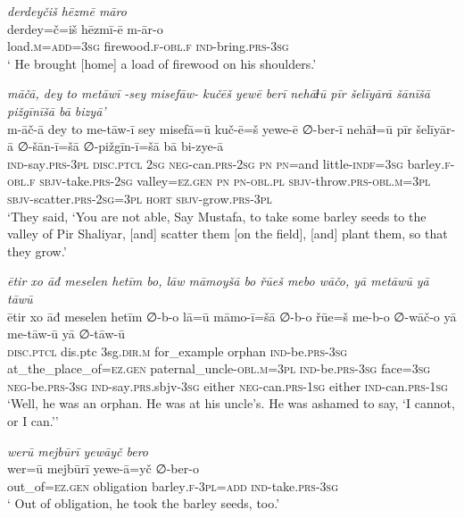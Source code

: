 \ea \label{ŽP.25}
\textit{derdeyčiš hēzmē māro} \\ 
\gll derdey=č=iš hēzmī-ē m-ār-o \\ 
 load\textsc{.m}\textsc{=add}\textsc{=3sg} firewood\textsc{.f}\textsc{-obl}\textsc{.f} \textsc{ind-}bring\textsc{.prs}\textsc{-3sg} \\ 
\glt ` He brought [home] a load of firewood on his shoulders.'
\z 
 
\ea \label{ŽP.27}
\textit{māčā, dey to metāwī -sey misefāw- kučēš yewē berī nehāɫū pīr šelīyārā šānīšā pižgīnīšā bā bizyā’} \\ 
\gll m-āč-ā dey to me-tāw-ī sey misefā=ū kuč-ē=š yewe-ē ∅-ber-ī nehāɫ=ū pīr šelīyār-ā ∅-šān-ī=šā ∅-pižgīn-ī=šā bā bi-zye-ā \\ 
 \textsc{ind-}say\textsc{.prs}\textsc{-3pl} \textsc{disc.ptcl} \textsc{2sg} \textsc{neg-}can\textsc{.prs}-\textsc{2sg} \textsc{pn} \textsc{pn}=and little\textsc{-indf}\textsc{=3sg} barley\textsc{.f}\textsc{-obl}\textsc{.f} \textsc{sbjv-}take\textsc{.prs}-\textsc{2sg} valley\textsc{\textsc{=ez.gen}} \textsc{pn} \textsc{pn}\textsc{-obl}\textsc{.pl} \textsc{sbjv-}throw\textsc{.prs}\textsc{-obl}\textsc{.m}\textsc{=3pl} \textsc{sbjv-}scatter\textsc{.prs}-\textsc{2sg}\textsc{=3pl} \textsc{hort} \textsc{sbjv-}grow\textsc{.prs}\textsc{-3pl} \\ 
\glt `They said, ‘You are not able, Say Mustafa, to take some barley seeds to the valley of Pir Shaliyar, [and] scatter them [on the field], [and] plant them, so that they grow.'
\z 
 
\ea \label{ŽP.28}
\textit{ētir xo āđ meselen hetīm bo, lāw māmoyšā bo řūeš mebo wāčo, yā metāwū yā tāwū} \\ 
\gll ētir xo āđ meselen hetīm ∅-b-o lā=ū māmo-ī=šā ∅-b-o řūe=š me-b-o ∅-wāč-o yā me-tāw-ū yā ∅-tāw-ū \\ 
 \textsc{disc.ptcl} dis.ptc 3sg\textsc{.dir}\textsc{.m} for\_example orphan \textsc{ind-}be\textsc{.prs}\textsc{-3sg} at\_the\_place\_of\textsc{\textsc{=ez.gen}} paternal\_uncle\textsc{-obl}\textsc{.m}\textsc{=3pl} \textsc{ind-}be\textsc{.prs}\textsc{-3sg} face\textsc{=3sg} \textsc{neg-}be\textsc{.prs}\textsc{-3sg} \textsc{ind-}say\textsc{.prs}.sbjv\textsc{-3sg} either \textsc{neg-}can\textsc{.prs}\textsc{-\textsc{1sg}} either \textsc{ind-}can\textsc{.prs}\textsc{-\textsc{1sg}} \\ 
\glt `Well, he was an orphan. He was at his uncle’s. He was ashamed to say, ‘I cannot, or I can.’'
\z 
 
\ea \label{ŽP.29}
\textit{werū mejbūrī yewāyč bero} \\ 
\gll wer=ū mejbūrī yewe-ā=yč ∅-ber-o \\ 
 out\_of\textsc{\textsc{=ez.gen}} obligation barley\textsc{.f}\textsc{-3pl}\textsc{=add} \textsc{ind-}take\textsc{.prs}\textsc{-3sg} \\ 
\glt ` Out of obligation, he took the barley seeds, too.'
\z 
 
